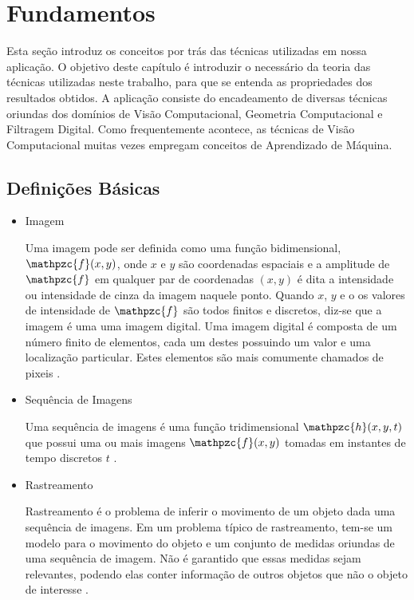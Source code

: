 \chapter{Fundamentos\label{chap:FundamentacaoMatematica}}

Esta seção introduz os conceitos por trás das técnicas utilizadas em nossa
aplicação. O objetivo deste capítulo é introduzir o necessário da teoria das
técnicas utilizadas neste trabalho, para que se entenda as propriedades dos
resultados obtidos. A aplicação consiste do encadeamento de diversas técnicas
oriundas dos domínios de Visão Computacional, Geometria Computacional e
Filtragem Digital. Como frequentemente acontece, as técnicas de Visão
Computacional muitas vezes empregam conceitos de Aprendizado de Máquina. 


\section{Definições Básicas}

\begin{itemize}
\item Imagem

Uma imagem pode ser definida como uma função bidimensional, $\mathpzc{f}(x,y)$,
onde $x$ e $y$ são coordenadas espaciais e a amplitude de $\mathpzc{f}$ em
qualquer par de coordenadas $(x,y)$ é dita a intensidade ou intensidade de cinza
da imagem naquele ponto. Quando $x$, $y$ e o os valores de intensidade de
$\mathpzc{f}$ são todos finitos e discretos, diz-se que a imagem é uma uma
imagem digital. Uma imagem digital é composta de um número finito de elementos,
cada um destes possuindo um valor e uma localização particular. Estes elementos
são mais comumente chamados de pixeis \cite{gonzalesDigitalImageProc}.

\item Sequência de Imagens

Uma sequência de imagens é uma função tridimensional $\mathpzc{h}(x,y,t)$ que
possui uma ou mais imagens $\mathpzc{f}(x,y)$ tomadas em instantes de tempo
discretos $t$ \cite{def:imageSequence}.

\item Rastreamento

Rastreamento é o problema de inferir o movimento de um objeto dada uma sequência
de imagens. Em um problema típico de rastreamento, tem-se um modelo para o
movimento do objeto e um conjunto de medidas oriundas de uma sequência de
imagem. Não é garantido que essas medidas sejam relevantes, podendo elas conter
informação de outros objetos que não o objeto de interesse
\cite{computer-vision-modern-approach-forsithy}.

\end{itemize}


